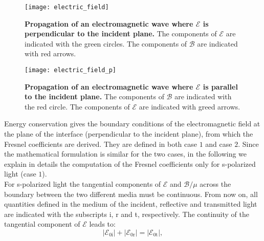 \begin{figure}[h]
 \label{fig:electric_field}
     \begin{center}
     \texttt{[image: electric\_field]}
     \end{center}
     \caption{\textbf{Propagation of an electromagnetic wave where $\boldsymbol{\mathcal{E}}$ is perpendicular to the incident plane.} The components of $\boldsymbol{\mathcal{E}}$ are indicated with the green circles.
The components of $\boldsymbol{\mathcal{B}}$ are indicated with red arrows.}
\label{fig:electric_field}
 \end{figure}
\begin{figure}[h]
 \label{fig:electric_field_p}
     \begin{center}
     \texttt{[image: electric\_field\_p]}
     \end{center}
 \caption{\textbf{Propagation of an electromagnetic wave where $\boldsymbol{\mathcal{E}}$ is parallel to the incident plane.} The components of $\boldsymbol{\mathcal{B}}$ are indicated with the red circle.
The components of $\boldsymbol{\mathcal{E}}$ are indicated with greed arrows.}
\label{fig:electric_field_p}
 \end{figure}
Energy conservation gives the boundary conditions of the electromagnetic field at the plane of the interface (perpendicular to the incident plane), from which the Fresnel coefficients are derived. They are defined in both case $1$ and case $2$. Since the mathematical formulation is similar for the two cases, in the following we explain in details the computation of the Fresnel coefficients only for s-polarized light (case $1$).\\ 
\indent For s-polarized light the tangential components of $\boldsymbol{\mathcal{E}}$ and $\boldsymbol{\mathcal{B}}/\mu$ across the boundary between the two different media must be continuous. From now on, all quantities defined in the medium of the incident, reflective and transmitted light are indicated with the subscripts \textrm{i}, \textrm{r} and \textrm{t}, respectively. The continuity of the tangential component of $\boldsymbol{\mathcal{E}}$ leads to:
\begin{equation}\label{Econservation}
|\boldsymbol{\mathcal{E}}_{0\textrm{i}}|+|\boldsymbol{\mathcal{E}}_{0\textrm{r}}|= |\boldsymbol{\mathcal{E}}_{0\textrm{t}}|,
\end{equation} 

